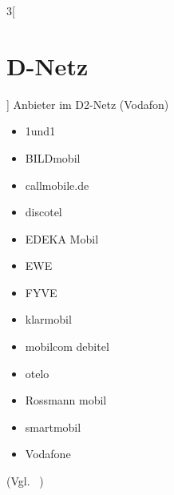 \begin{multicols}{3}[\section {D-Netz}]
Anbieter im D2-Netz (Vodafon)

\begin{itemize}
\item 1und1
\item BILDmobil
\item callmobile.de
\item discotel
\item EDEKA Mobil
\item EWE
\item FYVE
\item klarmobil
\item mobilcom debitel
\item otelo
\item Rossmann mobil
\item smartmobil
\item Vodafone
\end{itemize}
(Vgl. ~\cite{DNetz.1})



\end{multicols}
\newpage
